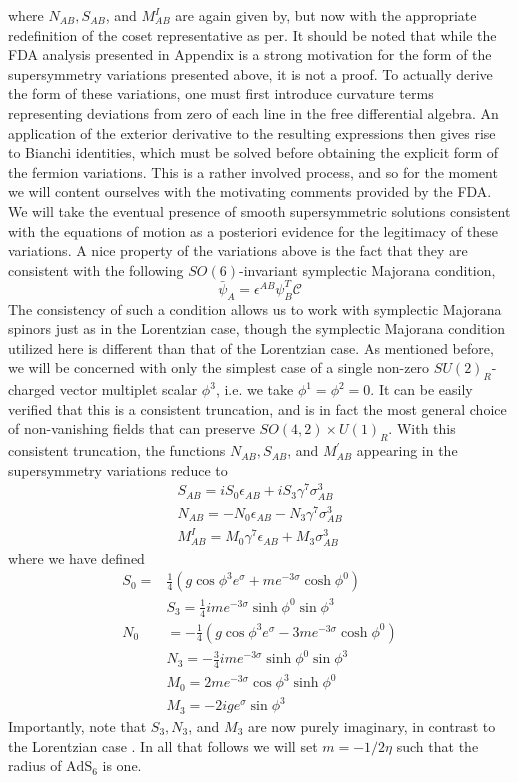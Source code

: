 \documentclass{article}
\begin{document}
where \(N_{A B}, S_{A B}\), and \(M_{A B}^{I}\) are again given by, but now with the appropriate redefinition of the coset representative as per. It should be noted that while the FDA analysis presented in Appendix is a strong motivation for the form of the supersymmetry variations presented above, it is not a proof. To actually derive the form of these variations, one must first introduce curvature terms representing deviations from zero of each line in the free differential algebra. An application of the exterior derivative to the resulting expressions then gives rise to Bianchi identities, which must be solved before obtaining the explicit form of the fermion variations. This is a rather involved process, and so for the moment we will content ourselves with the motivating comments provided by the FDA. We will take the eventual presence of smooth supersymmetric solutions consistent with the equations of motion as a posteriori evidence for the legitimacy of these variations. A nice property of the variations above is the fact that they are consistent with the following \(S O(6)\)-invariant symplectic Majorana condition,
\[
\bar{\psi}_{A}=\epsilon^{A B} \psi_{B}^{T} \mathcal{C}
\]
The consistency of such a condition allows us to work with symplectic Majorana spinors just as in the Lorentzian case, though the symplectic Majorana condition utilized here is different than that of the Lorentzian case. As mentioned before, we will be concerned with only the simplest case of a single non-zero \(S U(2)_{R}\)-charged vector multiplet scalar \(\phi^{3}\), i.e. we take \(\phi^{1}=\phi^{2}=0\). It can be easily verified that this is a consistent truncation, and is in fact the most general choice of non-vanishing fields that can preserve \(S O(4,2) \times U(1)_{R}\). With this consistent truncation, the functions \(N_{A B}, S_{A B}\), and \(M_{A B}^{\prime}\) appearing in the supersymmetry variations reduce to
\[
\begin{array}{l}
S_{A B}=i S_{0} \epsilon_{A B}+i S_{3} \gamma^{7} \sigma_{A B}^{3} \\
N_{A B}=-N_{0} \epsilon_{A B}-N_{3} \gamma^{7} \sigma_{A B}^{3} \\
M_{A B}^{I}=M_{0} \gamma^{7} \epsilon_{A B}+M_{3} \sigma_{A B}^{3}
\end{array}
\]
where we have defined
\[
\begin{aligned}
S_{0}= & \frac{1}{4}\left(g \cos \phi^{3} e^{\sigma}+m e^{-3 \sigma} \cosh \phi^{0}\right) \\
& S_{3}=\frac{1}{4} i m e^{-3 \sigma} \sinh \phi^{0} \sin \phi^{3} \\
N_{0} & =-\frac{1}{4}\left(g \cos \phi^{3} e^{\sigma}-3 m e^{-3 \sigma} \cosh \phi^{0}\right) \\
& N_{3}=-\frac{3}{4} i m e^{-3 \sigma} \sinh \phi^{0}  \sin \phi^{3} \\
& M_{0}=2 m e^{-3 \sigma} \cos \phi^{3} \sinh \phi^{0} \\
& M_{3}=-2 i g e^{\sigma} \sin \phi^{3}
\end{aligned}
\]
Importantly, note that \(S_{3}, N_{3}\), and \(M_{3}\) are now purely imaginary, in contrast to the Lorentzian case . In all that follows we will set \(m=-1 / 2 \eta\) such that the radius of \(\mathrm{AdS}_{6}\) is one.
\end{document}
